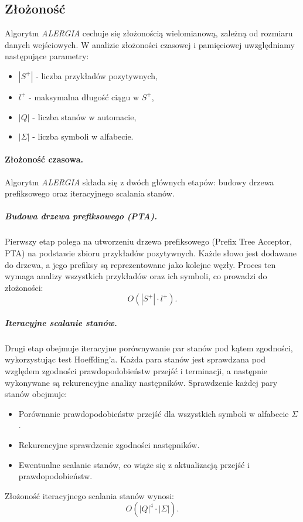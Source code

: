\subsection{Złożoność}  
Algorytm \textit{ALERGIA} cechuje się złożonością wielomianową, zależną od rozmiaru danych wejściowych. W analizie złożoności czasowej i pamięciowej uwzględniamy następujące parametry:  
\begin{itemize}  
    \item \(|S^+|\) - liczba przykładów pozytywnych,  
    \item \( l^+ \) - maksymalna długość ciągu w \( S^+ \),  
    \item \(|Q|\) - liczba stanów w automacie,  
    \item \(|\Sigma|\) - liczba symboli w alfabecie.  
\end{itemize}  

\paragraph*{Złożoność czasowa.}  
Algorytm \textit{ALERGIA} składa się z dwóch głównych etapów: budowy drzewa prefiksowego oraz iteracyjnego scalania stanów.  

\subparagraph*{Budowa drzewa prefiksowego (PTA).}  
Pierwszy etap polega na utworzeniu drzewa prefiksowego (Prefix Tree Acceptor, PTA) na podstawie zbioru przykładów pozytywnych. Każde słowo jest dodawane do drzewa, a jego prefiksy są reprezentowane jako kolejne węzły. Proces ten wymaga analizy wszystkich przykładów oraz ich symboli, co prowadzi do złożoności:  
\[
O(|S^+| \cdot l^+).
\]  

\subparagraph*{Iteracyjne scalanie stanów.}  
Drugi etap obejmuje iteracyjne porównywanie par stanów pod kątem zgodności, wykorzystując test Hoeffding’a. Każda para stanów jest sprawdzana pod względem zgodności prawdopodobieństw przejść i terminacji, a następnie wykonywane są rekurencyjne analizy następników. Sprawdzenie każdej pary stanów obejmuje:
\begin{itemize}  
    \item Porównanie prawdopodobieństw przejść dla wszystkich symboli w alfabecie \( \Sigma \).  
    \item Rekurencyjne sprawdzenie zgodności następników.  
    \item Ewentualne scalanie stanów, co wiąże się z aktualizacją przejść i prawdopodobieństw.  
\end{itemize}  

Złożoność iteracyjnego scalania stanów wynosi:  
\[
O(|Q|^4 \cdot |\Sigma|).
\]  

